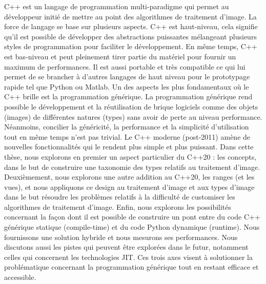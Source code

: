 \noindent C++ est un langage de programmation multi-paradigme qui permet au développeur initié de mettre au point des
algorithmes de traitement d'image. La force de langage se base sur plusieurs aspects. C++ est haut-niveau, cela signifie
qu'il est possible de développer des abstractions puissantes mélangeant plusieurs styles de programmation pour faciliter
le développement. En même temps, C++ est bas-niveau et peut pleinement tirer partie du matériel pour fournir un maximum
de performances. Il est aussi portable et très compatible ce qui lui permet de se brancher à d'autres langages de haut
niveau pour le prototypage rapide tel que Python ou Matlab. Un des aspects les plus fondamentaux où le C++ brille est la
programmation générique. La programmation générique rend possible le développement et la réutilisation de brique
logiciels comme des objets (images) de différentes natures (types) sans avoir de perte au niveau performance. Néanmoins,
concilier la généricité, la performance et la simplicité d'utilisation tout en même temps n'est pas trivial. Le C++
moderne (post-2011) amène de nouvelles fonctionnalités qui le rendent plus simple et plus puissant. Dans cette thèse,
nous explorons en premier un aspect particulier du C++20 : les concepts, dans le but de construire une taxonomie des
types relatifs au traitement d'image. Deuxièmement, nous explorons une autre addition au C++20, les ranges (et les
vues), et nous appliquons ce design au traitement d'image et aux types d'image dans le but résoudre les problèmes
relatifs à la difficulté de customiser les algorithmes de traitement d'image. Enfin, nous explorons les possibilités
concernant la façon dont il est possible de construire un pont entre du code C++ générique statique (compile-time) et du
code Python dynamique (runtime). Nous fournissons une solution hybride et nous mesurons ses performances. Nous discutons
aussi les pistes qui peuvent être explorées dans le futur, notamment celles qui concernent les technologies JIT. Ces
trois axes visent à solutionner la problématique concernant la programmation générique tout en restant efficace et
accessible.
